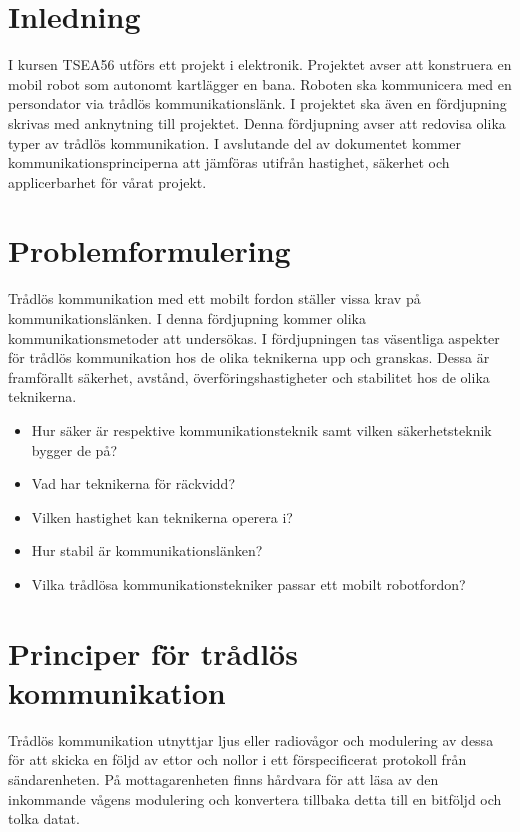 \documentclass[a4paper,12pt,fleqn]{article}
\begin{document}
\addto\captionsswedish{\renewcommand{\contentsname}{Innehållsförteckning}}

\tableofcontents
\thispagestyle{fancy}
\newpage

\section{Inledning}
I kursen TSEA56 utförs ett projekt i elektronik. Projektet avser att konstruera en mobil robot som autonomt kartlägger en bana. Roboten ska kommunicera med en persondator via trådlös kommunikationslänk. I projektet ska även en fördjupning skrivas med anknytning till projektet. Denna fördjupning avser att redovisa olika typer av trådlös kommunikation. I avslutande del av dokumentet kommer kommunikationsprinciperna att jämföras utifrån hastighet, säkerhet och applicerbarhet för vårat projekt. 

\section{Problemformulering}
Trådlös kommunikation med ett mobilt fordon ställer vissa krav på kommunikationslänken. I denna fördjupning kommer olika kommunikationsmetoder att undersökas. I fördjupningen tas väsentliga aspekter för trådlös kommunikation hos de olika teknikerna upp och granskas. Dessa är framförallt säkerhet, avstånd, överföringshastigheter och stabilitet hos de olika teknikerna. 
\begin{itemize}
\item Hur säker är respektive kommunikationsteknik samt vilken säkerhetsteknik bygger de på?
\item Vad har teknikerna för räckvidd?
\item Vilken hastighet kan teknikerna operera i?
\item Hur stabil är kommunikationslänken?
\item Vilka trådlösa kommunikationstekniker passar ett mobilt robotfordon?
\end{itemize}
\newpage

\section{Principer för trådlös kommunikation}

Trådlös kommunikation utnyttjar ljus eller radiovågor och modulering av dessa för att skicka en följd av ettor och nollor i ett förspecificerat protokoll från sändarenheten. På mottagarenheten finns hårdvara för att läsa av den inkommande vågens modulering och konvertera tillbaka detta till en bitföljd och tolka datat.
\end{document}
